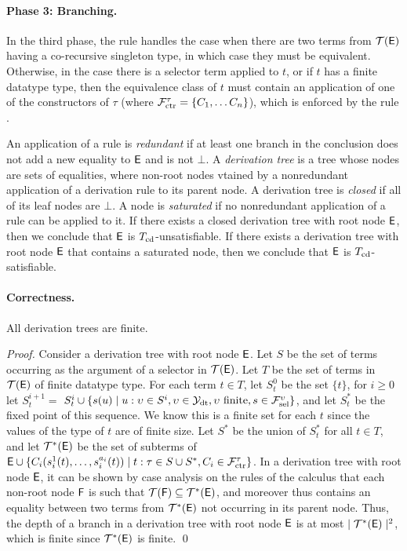 \paragraph{Phase 3: Branching.}
In the third phase,
the  rule handles the case when there are two terms from $\mathcal{T}(\mathsf{E})$
having a co-recursive singleton type, in which case they must be equivalent.
Otherwise, in the case there is a selector term applied to $t$, or if $t$ has a finite datatype type,
then the equivalence class of $t$ must contain an application of one of the constructors of $\tau$ (where $\mathcal{F}_{\mathrm{ctr}}^\tau = \{ C_1, \ldots C_n \}$),
which is enforced by the rule .

An application of a rule is \emph{redundant} if at least one branch in the
conclusion does not add a new equality to $\mathsf{E}$ and is not $\bot$.
A \emph{derivation tree} is a tree whose nodes are sets of equalities, where non-root nodes vtained by
a nonredundant application of a derivation rule to its parent node.
A derivation tree is \emph{closed} if all of its leaf nodes are $\bot$.
A node is \emph{saturated} if no nonredundant application of a rule can be applied to it.
If there exists a closed derivation tree with root node $\mathsf{E}$, then we conclude that $\mathsf{E}$ is $T_{\mathrm{cd}}$-unsatisfiable.
If there exists a derivation tree with root node $\mathsf{E}$ that contains a saturated node, then we conclude that $\mathsf{E}$ is $T_{\mathrm{cd}}$-satisfiable.

\paragraph{Correctness.}

\begin{lemma}[Termination]%
\label{lem:t}%
\afterDot
All derivation trees are finite.
\end{lemma}
\begin{proof}
Consider a derivation tree with root node $\mathsf{E}$.
Let $S$ be the set of terms occurring as the argument of a selector in $\mathcal{T}(\mathsf{E})$.
Let $T$ be the set of terms in $\mathcal{T}(\mathsf{E})$ of finite datatype type.
For each term $t \in T$,
let $S^0_t$ be the set $\{ t \}$,
for $i \geq 0$ let $S^{i+1}_t =$ $S^i_t \cup \{ s( u ) \mid u : \upsilon \in S^i, \upsilon \in \mathcal{Y}_{\mathrm{dt}}, \upsilon \text{ finite}, s \in \mathcal{F}_{\mathrm{sel}}^{\upsilon}  \}$,
and let $S^\ast_t$ be the fixed point of this sequence.
We know this is a finite set for each $t$ since the values of the type of $t$ are of finite size.
Let $S^\ast$ be the union of $S^\ast_t$ for all $t \in T$,
and let $\mathcal{T}^\ast(\mathsf{E})$ be the set of subterms of $\mathsf{E} \cup \{ C_i( s^1_i( t ), \ldots, s^{a_i}_i( t ) ) \mid t : \tau \in S \cup S^\ast, C_i \in \mathcal{F}_{\mathrm{ctr}}^\tau \}$.
In a derivation tree with root node $\mathsf{E}$,
it can be shown by case analysis on the rules of the calculus that each non-root node $\mathsf{F}$ is such that
$\mathcal{T}(\mathsf{F}) \subseteq \mathcal{T}^\ast(\mathsf{E})$, and moreover thus contains an equality between two terms from $\mathcal{T}^\ast(\mathsf{E})$ not occurring in its parent node.
Thus, the depth of a branch in a derivation tree with root node $\mathsf{E}$ is at most $\mid \mathcal{T}^\ast(\mathsf{E}) \mid^2$,
which is finite since $\mathcal{T}^\ast(\mathsf{E})$ is finite.
\qed
\end{proof}


